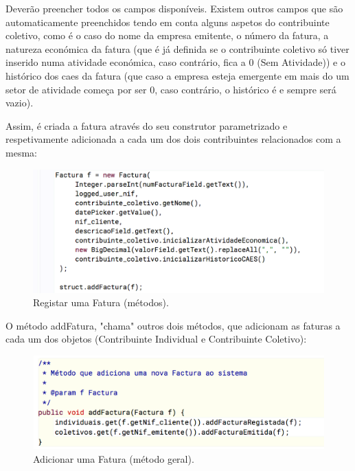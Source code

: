 \documentclass[a4paper]{article}
\begin{document}
\begin{itemize}
Deverão preencher todos os campos disponíveis. Existem outros campos que são automaticamente
preenchidos tendo em conta alguns aspetos do contribuinte coletivo, como é o caso
do nome da empresa emitente, o número da fatura, a natureza económica da fatura
(que é já definida se o contribuinte coletivo só tiver inserido numa atividade
económica, caso contrário, fica a 0 (Sem Atividade)) e o histórico dos caes da
fatura (que caso a empresa esteja emergente em mais do um setor de atividade
começa por ser 0, caso contrário, o histórico é e sempre será vazio).

\vspace{0.1cm}

Assim, é criada a fatura através do seu construtor parametrizado e respetivamente
adicionada a cada um dos dois contribuintes relacionados com a mesma:

\begin{figure}[H]
\centering
\includegraphics[scale=0.40]{imgs/registarfatura_func.png}
\caption{Registar uma Fatura (métodos).}
\label{img:registarfatura_func}
\end{figure}

O método \textsf{addFatura}, "chama" outros dois métodos, que adicionam as faturas a cada um
dos objetos (Contribuinte Individual e Contribuinte Coletivo):

\begin{figure}[H]
\centering
\includegraphics[scale=0.40]{imgs/addFatura.png}
\caption{Adicionar uma Fatura (método geral).}
\label{img:addFatura}
\end{figure}



\end{itemize}
\end{document}
